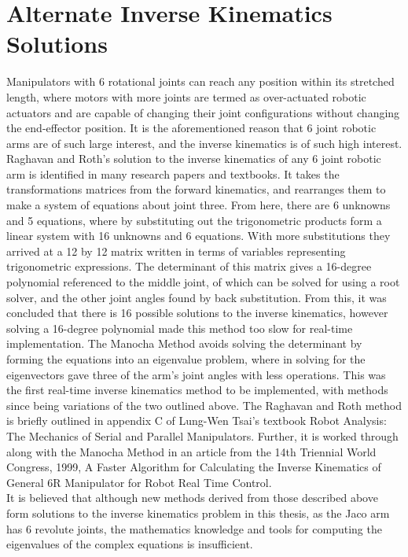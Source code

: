 \documentclass[12pt,openany,a4paper]{book}
\begin{document}
{\section{Alternate Inverse Kinematics Solutions}

Manipulators with 6 rotational joints can reach any position within its stretched length, where motors with more joints are termed as over-actuated robotic actuators and are capable of changing their joint configurations without changing the end-effector position. It is the aforementioned reason that 6 joint robotic arms are of such large interest, and the inverse kinematics is of such high interest.\\
Raghavan and Roth's solution to the inverse kinematics of any 6 joint robotic arm is identified in many research papers and textbooks. It takes the transformations matrices from the forward kinematics, and rearranges them to make a system of equations about joint three. From here, there are 6 unknowns and 5 equations, where by substituting out the trigonometric products form a linear system with 16 unknowns and 6 equations. With more substitutions they arrived at a 12 by 12 matrix written in terms of variables representing trigonometric expressions. The determinant of this matrix gives a 16-degree polynomial referenced to the middle joint, of which can be solved for using a root solver, and the other joint angles found by back substitution. From this, it was concluded that there is 16 possible solutions to the inverse kinematics, however solving a 16-degree polynomial made this method too slow for real-time implementation. The Manocha Method avoids solving the determinant by forming the equations into an eigenvalue problem, where in solving for the eigenvectors gave three of the arm's joint angles with less operations. This was the first real-time inverse kinematics method to be implemented, with methods since being variations of the two outlined above. The Raghavan and Roth method is briefly outlined in appendix C of Lung-Wen Tsai's textbook Robot Analysis: The Mechanics of Serial and Parallel Manipulators. Further, it is worked through along with the Manocha Method in an article from the 14th Triennial World Congress, 1999, A Faster Algorithm for Calculating the Inverse Kinematics of General 6R Manipulator for Robot Real Time Control.\\
It is believed that although new methods derived from those described above form solutions to the inverse kinematics problem in this thesis, as the Jaco arm has 6 revolute joints, the mathematics knowledge and tools for computing the eigenvalues of the complex equations is insufficient.\\

}
\end{document}

